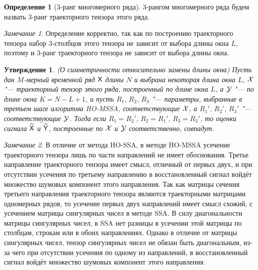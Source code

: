 \documentclass[specialist,
  substylefile=spbu_report.rtx,
subf,href,colorlinks=true, 12pt]{disser}
\theoremstyle{plain}
\newtheorem{statement}{Утверждение}[section]
\theoremstyle{definition}
\newtheorem{definition}{Определение}[section]
\theoremstyle{remark}
\newtheorem{remark}{Замечание}[section]
\begin{document}
\begin{definition}[3-ранг многомерного ряда]
  3-рангом многомерного ряда будем назвать 3-ранг траекторного
  тензора этого ряда.
\end{definition}
\begin{remark}
  Определение корректно, так как по построению траекторного тензора
  набор 3-столбцов этого тензора
  не зависит от выбора длины окна $L$, поэтому и $3$-ранг
  траекторного тензора не зависит от выбора
  длины окна.
\end{remark}

\begin{statement}
  \emph{(О симметричности относительно замены длины окна)}
  Пусть дан $M$-мерный временной ряд $\mathsf{X}$ длины $N$ и выбрана
  некоторая длина окна $L$,
  $\mathcal{X}$ "--- траекторный тензор этого ряда, построенный по длине окна $L$, а
  $\mathcal{Y}$ "--- по длине окна ${K = N - L + 1}$, и пусть
  $R_1,\, R_2,\, R_3$ "--- параметры, выбранные в третьем шаге
  алгоритма \emph{HO-MSSA}, соответствующие $\mathcal{X}$,
  а $R_1',\, R_2',\, R_3'$ "--- соответствующие $\mathcal{Y}$.
  Тогда если $R_1 = R_2',\, R_2 = R_1',\,  R_3 = R_3'$, то
  оценки сигнала $\widetilde{\mathsf{X}}$ и $\widetilde{\mathsf{Y}}$, построенные
  по $\mathcal{X}$ и $\mathcal{Y}$ соответственно,
  совпадут.
\end{statement}

\begin{remark}\label{remark:ho-mssa-trunc-dims}
  В отличие от метода HO-SSA, в методе HO-MSSA усечение траекторного тензора
  лишь по части направлений не имеет обоснования.
  Третье направление траекторного тензора имеет смысл,
  отличный от первых двух, и при отсутствии усечения по третьему
  направлению в восстановленный сигнал войдёт множество шумовых компонент
  этого направления.
  Так как матрицы сечения третьего направления траекторного тензора
  являются траекторными матрицами одномерных рядов, то усечение
  первых двух направлений имеет смысл схожий, с усечением матрицы
  сингулярных чисел в методе SSA.
  В силу диагональности матрицы сингулярных чисел, в
  SSA нет разницы в усечении этой матрицы по столбцам, строкам или в
  обоих направлениях.
  Однако в отличие от матрицы сингулярных чисел, тензор сингулярных чисел
  не обязан быть диагональным, из-за чего при отсутствии усечения по одному
  из направлений, в восстановленный сигнал войдёт множество шумовых
  компонент этого направления.
\end{remark}
\end{document}
